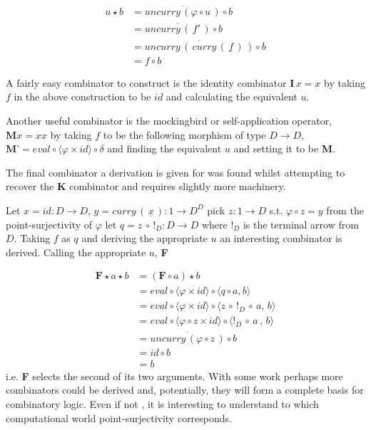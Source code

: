 \begin{align*}
    u \star b &= \overline{uncurry \, (\varphi \circ u \, )} \circ b \\
    &= \overline{uncurry \, ( \, f' \, ) } \circ b \\
    &= \overline{uncurry \, ( \, curry \, ( \, \underline{f} \, ) \, )} \circ b \\
    &= f \circ b
\end{align*}


A fairly easy combinator to construct is the identity combinator $\textbf{I} \, x =
x$ by taking $f$ in the above construction to be $id$ and calculating the
equivalent $u$.

Another useful combinator is the mockingbird or self-application operator,
$\textbf{M} x = x x$ by taking $f$ to be the following morphism of type $D
\rightarrow D$, $\textbf{M'} = eval \circ \langle \varphi \times id \rangle \circ
\delta$ and finding the equivalent $u$ and setting it to be \textbf{M}.

The final combinator a derivation is given for was found whilst attempting to
recover the \textbf{K} combinator and requires slightly more machinery.

Let $x = id : D \rightarrow D$, $y = curry \, ( \, \underline{x} \, ) : 1
\rightarrow D^D$ pick $z : 1 \rightarrow D$ s.t. $\varphi \circ z = y$ from the
point-surjectivity of $\varphi$ let $q = z \, \circ \, !_{D} : D \rightarrow D$
where $!_{D}$ is the terminal arrow from $D$. Taking $f$ as $q$ and deriving the
appropriate $u$ an interesting combinator is derived. Calling the appropriate
$u$, \textbf{F}

\begin{align*}
    \textbf{F} \star a \star b &= (\textbf{F} \circ a) \star b \\
    &= eval \circ \langle \varphi  \times id \rangle \circ \langle q \circ a , b
    \rangle \\
    &= eval \circ \langle \varphi \times id \rangle \circ \langle z \, \circ \, !_{D}
    \, \circ \, a , \, b \rangle \\
    &= eval \circ \langle \varphi \circ z \times id \rangle \circ \langle !_{D} \,
    \circ \, a \, , \, b \rangle \\
    &= \overline{uncurry \, ( \varphi \circ z \, )} \circ b \\
    &= id \circ b \\
    &= b
\end{align*}
i.e. \textbf{F} selects the second of its two arguments. With some work perhaps
more combinators could be derived and, potentially, they will form a complete
basis for combinatory logic. Even if not , it is interesting to understand to
which computational world point-surjectivity corresponds.
